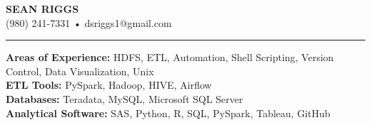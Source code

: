 \documentclass[a4paper,10pt]{article}
\begin{document}
\begin{center}
\textbf{\Large SEAN RIGGS}\\
(980) 241-7331 • dsriggs1@gmail.com\vspace{1mm}\\
\hrule height 2pt
\vspace{2mm}
\end{center}

\noindent
\textbf{Areas of Experience:}
HDFS,  ETL, Automation, Shell Scripting, Version Control, Data Visualization, Unix\\
\textbf{ETL Tools:} PySpark, Hadoop, HIVE, Airflow \\
\textbf{Databases:} Teradata, MySQL, Microsoft SQL Server\\
\textbf{Analytical Software:} SAS, Python, R, SQL, PySpark, Tableau, GitHub\\
\end{document}
